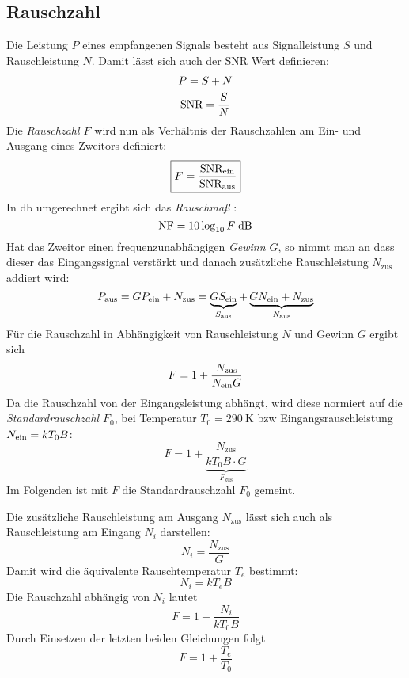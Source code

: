 \subsection{Rauschzahl}
Die Leistung $P$ eines empfangenen Signals besteht aus Signalleistung $S$ und Rauschleistung $N$.
Damit lässt sich auch der SNR Wert definieren:
\begin{gather}
    P=S+N\\
    \text{SNR} = \frac{S}{N}
\end{gather}
Die \emph{Rauschzahl $F$} wird nun als Verhältnis der Rauschzahlen am Ein- und Ausgang eines Zweitors
definiert:
\begin{equation}
    \boxed{F = \frac{\text{SNR}_{\text{ein}}}{\text{SNR}_{\text{aus}}}}
\end{equation}
In \si{\decibel} umgerechnet ergibt sich das \emph{Rauschmaß} \NF:
\begin{equation}
    \NF = 10\log_{10} F \; \si{\decibel}
\end{equation}
Hat das Zweitor einen frequenzunabhängigen \emph{Gewinn $G$}, so nimmt man an dass dieser das
Eingangssignal verstärkt und danach zusätzliche Rauschleistung $N_\text{zus}$ addiert wird:
\begin{equation}
    P_{\text{aus}} = GP_{\text{ein}} + N_\text{zus} = \underbrace{GS_{\text{ein}}}_{S_{\text{aus}}} + \underbrace{GN_{\text{ein}} + N_\text{zus}}_{N_{\text{aus}}}
\end{equation}
Für die Rauschzahl in Abhängigkeit von Rauschleistung $N$ und Gewinn $G$ ergibt sich
\begin{equation}
    F = 1 + \frac{N_\text{zus}}{N_{\text{ein}} G}
\end{equation}
Da die Rauschzahl von der Eingangsleistung abhängt, wird diese normiert auf die
\emph{ Standardrauschzahl $F_0$}, bei Temperatur $T_0 = \SI{290}{\kelvin}$ bzw Eingangsrauschleistung
$N_{\text{ein}} = kT_0B$:
\begin{equation}
    F = 1 + \underbrace{\frac{N_\text{zus}}{kT_0B \cdot G}}_{F_\text{zus}}
\end{equation}
Im Folgenden ist mit $F$ die Standardrauschzahl $F_0$ gemeint.

Die zusätzliche Rauschleistung am Ausgang $N_\text{zus}$ lässt sich auch als Rauschleistung am Eingang
$N_i$ darstellen:
\begin{equation}
    N_i = \frac{N_\text{zus}}{G}
\end{equation}
Damit wird die äquivalente Rauschtemperatur $T_e$ bestimmt:
\begin{equation}
    N_i = kT_eB
\end{equation}
Die Rauschzahl abhängig von $N_i$ lautet
\begin{equation}
    F = 1 + \frac{N_i}{kT_0B}
\end{equation}
Durch Einsetzen der letzten beiden Gleichungen folgt
\begin{equation}
    F = 1 + \frac{T_e}{T_0}
\end{equation}








